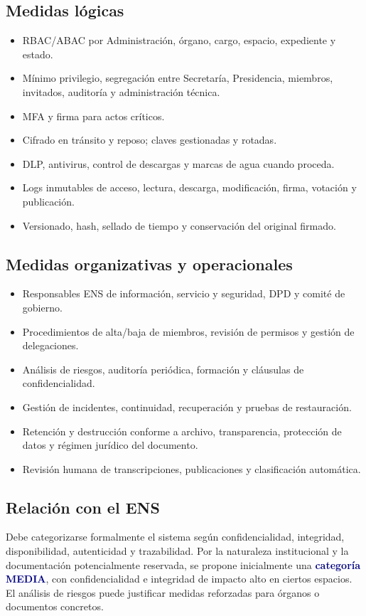 \documentclass[11pt,a4paper]{article}
\newcommand{\key}[1]{\textbf{\textcolor{navy}{#1}}}
\begin{document}
\subsection{Medidas lógicas}
\begin{itemize}
\item RBAC/ABAC por Administración, órgano, cargo, espacio, expediente y estado.
\item Mínimo privilegio, segregación entre Secretaría, Presidencia, miembros, invitados, auditoría y administración técnica.
\item MFA y firma para actos críticos.
\item Cifrado en tránsito y reposo; claves gestionadas y rotadas.
\item DLP, antivirus, control de descargas y marcas de agua cuando proceda.
\item Logs inmutables de acceso, lectura, descarga, modificación, firma, votación y publicación.
\item Versionado, hash, sellado de tiempo y conservación del original firmado.
\end{itemize}

\subsection{Medidas organizativas y operacionales}
\begin{itemize}
\item Responsables ENS de información, servicio y seguridad, DPD y comité de gobierno.
\item Procedimientos de alta/baja de miembros, revisión de permisos y gestión de delegaciones.
\item Análisis de riesgos, auditoría periódica, formación y cláusulas de confidencialidad.
\item Gestión de incidentes, continuidad, recuperación y pruebas de restauración.
\item Retención y destrucción conforme a archivo, transparencia, protección de datos y régimen jurídico del documento.
\item Revisión humana de transcripciones, publicaciones y clasificación automática.
\end{itemize}

\subsection{Relación con el ENS}

Debe categorizarse formalmente el sistema según confidencialidad, integridad, disponibilidad, autenticidad y trazabilidad. Por la naturaleza institucional y la documentación potencialmente reservada, se propone inicialmente una \key{categoría MEDIA}, con confidencialidad e integridad de impacto alto en ciertos espacios. El análisis de riesgos puede justificar medidas reforzadas para órganos o documentos concretos.
\end{document}
